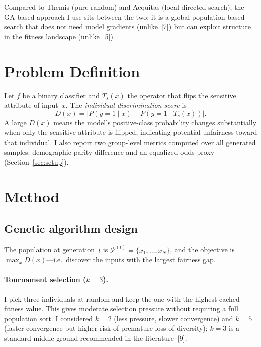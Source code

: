 \documentclass[10pt]{article}
\begin{document}
Compared to Themis (pure random) and Aequitas (local directed search), the GA-based
approach I use sits between the two: it is a global population-based search that does
not need model gradients (unlike~[7]) but can exploit structure in the fitness landscape
(unlike~[5]).

\section{Problem Definition}

Let $f$ be a binary classifier and $T_s(x)$ the operator that flips the sensitive
attribute of input~$x$.  The \emph{individual discrimination score} is
\begin{equation}\label{eq:disc}
D(x) = \bigl|P(y{=}1 \mid x) - P(y{=}1 \mid T_s(x))\bigr|.
\end{equation}
A large $D(x)$ means the model's positive-class probability changes substantially when
only the sensitive attribute is flipped, indicating potential unfairness toward that
individual.  I also report two group-level metrics computed over all generated samples:
demographic parity difference and an equalized-odds proxy (Section~\ref{sec:setup}).

\section{Method}

\subsection{Genetic algorithm design}

The population at generation~$t$ is
$\mathcal{P}^{(t)} = \{x_1, \ldots, x_N\}$, and the objective is
$\max_x D(x)$---i.e.\ discover the inputs with the largest fairness gap.

\paragraph{Tournament selection ($k{=}3$).}
I pick three individuals at random and keep the one with the highest cached fitness
value.  This gives moderate selection pressure without requiring a full population sort.
I considered $k{=}2$ (less pressure, slower convergence) and $k{=}5$ (faster convergence
but higher risk of premature loss of diversity); $k{=}3$ is a standard middle ground
recommended in the literature~[9].
\end{document}
